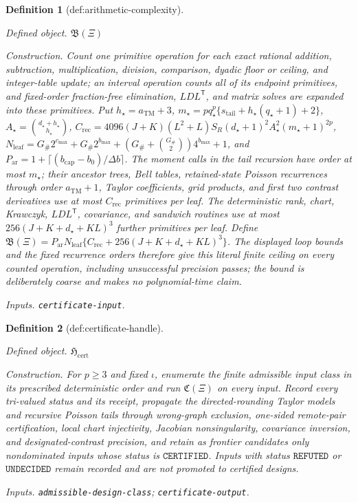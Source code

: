 \documentclass{article}
\newtheorem{definition}{Definition}
\begin{document}
\begin{definition}[def:arithmetic-complexity]\label{def:arithmetic-complexity}
\par\smallskip\noindent\emph{Defined object.} \(\mathfrak B(\Xi)\)
\par\smallskip\noindent\emph{Construction.} Count one primitive operation for each exact rational addition, subtraction, multiplication, division, comparison, dyadic floor or ceiling, and integer-table update; an interval operation counts all of its endpoint primitives, and fixed-order fraction-free elimination, \(LDL^{\mathsf T}\), and matrix solves are expanded into these primitives. Put \(h_\star=a_{\mathrm{TM}}+3\), \(m_\star=pq_\star^p\{s_{\mathrm{tail}}+h_\star(q_\star+1)+2\}\), \(A_\star=\binom{d_\star+h_\star}{h_\star}\), \(C_{\mathrm{rec}}=4096(J+K)(L^2+L)S_R(d_\star+1)^2A_\star^2(m_\star+1)^{2p}\), \(N_{\mathrm{leaf}}=G_{\#}2^{c_{\max}}+G_{\#}2^{b_{\max}}+(G_{\#}+\binom{G_{\#}}2)4^{b_{\max}}+1\), and \(P_{\mathrm{ar}}=1+\lceil(b_{\mathrm{cap}}-b_0)/\Delta b\rceil\). The moment calls in the tail recursion have order at most \(m_\star\); their ancestor trees, Bell tables, retained-state Poisson recurrences through order \(a_{\mathrm{TM}}+1\), Taylor coefficients, grid products, and first two contrast derivatives use at most \(C_{\mathrm{rec}}\) primitives per leaf. The deterministic rank, chart, Krawczyk, \(LDL^{\mathsf T}\), covariance, and sandwich routines use at most \(256(J+K+d_\star+KL)^3\) further primitives per leaf. Define \(\mathfrak B(\Xi)=P_{\mathrm{ar}}N_{\mathrm{leaf}}\{C_{\mathrm{rec}}+256(J+K+d_\star+KL)^3\}\). The displayed loop bounds and the fixed recurrence orders therefore give this literal finite ceiling on every counted operation, including unsuccessful precision passes; the bound is deliberately coarse and makes no polynomial-time claim.
\par\smallskip\noindent\emph{Inputs.} \texttt{certificate-\allowbreak{}input}.
\end{definition}

\begin{definition}[def:certificate-handle]\label{def:certificate-handle}
\par\smallskip\noindent\emph{Defined object.} \(\mathfrak H_{\mathrm{cert}}\)
\par\smallskip\noindent\emph{Construction.} For \(p\geq3\) and fixed \(\iota\), enumerate the finite admissible input class in its prescribed deterministic order and run \(\mathfrak C(\Xi)\) on every input. Record every tri-valued status and its receipt, propagate the directed-rounding Taylor models and recursive Poisson tails through wrong-graph exclusion, one-sided remote-pair certification, local chart injectivity, Jacobian nonsingularity, covariance inversion, and designated-contrast precision, and retain as frontier candidates only nondominated inputs whose status is \(\mathtt{CERTIFIED}\). Inputs with status \(\mathtt{REFUTED}\) or \(\mathtt{UNDECIDED}\) remain recorded and are not promoted to certified designs.
\par\smallskip\noindent\emph{Inputs.} \texttt{admissible-\allowbreak{}design-\allowbreak{}class}; \texttt{certificate-\allowbreak{}output}.
\end{definition}
\end{document}
